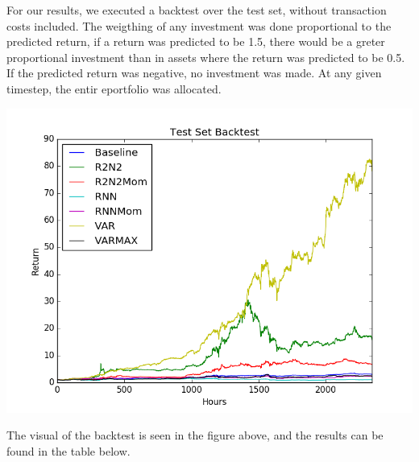 For our results, we executed a backtest over the test set, without transaction costs included. The weigthing of any investment was done proportional to the predicted return, if a return was predicted to be 1.5, there would be a greter proportional investment than in assets where the return was predicted to be 0.5. If the predicted return was negative, no investment was made. At any given timestep, the entir eportfolio was allocated. 

\begin{center}
\includegraphics[scale = 0.6]{Results/backtest_all.png}
\end{center}

The visual of the backtest is seen in the figure above, and the results can be found in the table below.



